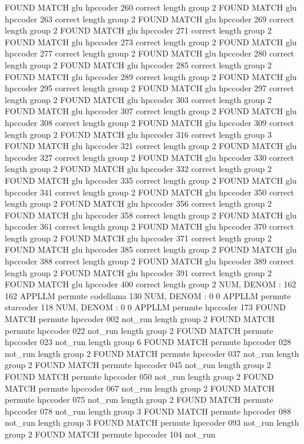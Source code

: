 FOUND MATCH glu hpccoder 260 correct
length group  2
FOUND MATCH glu hpccoder 263 correct
length group  2
FOUND MATCH glu hpccoder 269 correct
length group  2
FOUND MATCH glu hpccoder 271 correct
length group  2
FOUND MATCH glu hpccoder 273 correct
length group  2
FOUND MATCH glu hpccoder 277 correct
length group  2
FOUND MATCH glu hpccoder 280 correct
length group  2
FOUND MATCH glu hpccoder 285 correct
length group  2
FOUND MATCH glu hpccoder 289 correct
length group  2
FOUND MATCH glu hpccoder 295 correct
length group  2
FOUND MATCH glu hpccoder 297 correct
length group  2
FOUND MATCH glu hpccoder 303 correct
length group  2
FOUND MATCH glu hpccoder 307 correct
length group  2
FOUND MATCH glu hpccoder 308 correct
length group  2
FOUND MATCH glu hpccoder 309 correct
length group  2
FOUND MATCH glu hpccoder 316 correct
length group  3
FOUND MATCH glu hpccoder 321 correct
length group  2
FOUND MATCH glu hpccoder 327 correct
length group  2
FOUND MATCH glu hpccoder 330 correct
length group  2
FOUND MATCH glu hpccoder 332 correct
length group  2
FOUND MATCH glu hpccoder 335 correct
length group  2
FOUND MATCH glu hpccoder 341 correct
length group  2
FOUND MATCH glu hpccoder 350 correct
length group  2
FOUND MATCH glu hpccoder 356 correct
length group  2
FOUND MATCH glu hpccoder 358 correct
length group  2
FOUND MATCH glu hpccoder 361 correct
length group  2
FOUND MATCH glu hpccoder 370 correct
length group  2
FOUND MATCH glu hpccoder 371 correct
length group  2
FOUND MATCH glu hpccoder 385 correct
length group  2
FOUND MATCH glu hpccoder 388 correct
length group  2
FOUND MATCH glu hpccoder 389 correct
length group  2
FOUND MATCH glu hpccoder 391 correct
length group  2
FOUND MATCH glu hpccoder 400 correct
length group  2
NUM, DENOM : 162 162
APPLLM permute codellama
130
NUM, DENOM : 0 0
APPLLM permute starcoder
118
NUM, DENOM : 0 0
APPLLM permute hpccoder
173
FOUND MATCH permute hpccoder 002 not_run
length group  2
FOUND MATCH permute hpccoder 022 not_run
length group  2
FOUND MATCH permute hpccoder 023 not_run
length group  6
FOUND MATCH permute hpccoder 028 not_run
length group  2
FOUND MATCH permute hpccoder 037 not_run
length group  2
FOUND MATCH permute hpccoder 045 not_run
length group  2
FOUND MATCH permute hpccoder 050 not_run
length group  2
FOUND MATCH permute hpccoder 067 not_run
length group  2
FOUND MATCH permute hpccoder 075 not_run
length group  2
FOUND MATCH permute hpccoder 078 not_run
length group  3
FOUND MATCH permute hpccoder 088 not_run
length group  3
FOUND MATCH permute hpccoder 093 not_run
length group  2
FOUND MATCH permute hpccoder 104 not_run
